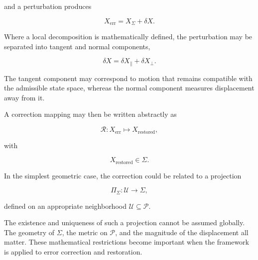 \documentclass[12pt,oneside]{book}
\newcommand{\Corr}{\mathcal{R}}
\begin{document}
and a perturbation produces

\begin{equation}
    X_{\mathrm{err}}
    =
    X_{\Sigma}
    +
    \delta X.
    \label{eq:error-state}
\end{equation}

Where a local decomposition is mathematically defined, the
perturbation may be separated into tangent and normal
components,

\begin{equation}
    \delta X
    =
    \delta X_{\parallel}
    +
    \delta X_{\perp}.
    \label{eq:tangent-normal-decomposition}
\end{equation}

The tangent component may correspond to motion that remains
compatible with the admissible state space, whereas the normal
component measures displacement away from it.

A correction mapping may then be written abstractly as

\begin{equation}
    \Corr:
    X_{\mathrm{err}}
    \longmapsto
    X_{\mathrm{restored}},
    \label{eq:correction-map}
\end{equation}

with

\begin{equation}
    X_{\mathrm{restored}}
    \in
    \Sigma.
    \label{eq:restored-state}
\end{equation}

In the simplest geometric case, the correction could be related
to a projection

\begin{equation}
    \Pi_{\Sigma}:
    \mathcal{U}
    \rightarrow
    \Sigma,
    \label{eq:projection-operator}
\end{equation}

defined on an appropriate neighborhood
\(\mathcal{U}\subseteq\mathcal{P}\).

The existence and uniqueness of such a projection cannot be
assumed globally. The geometry of \(\Sigma\), the metric on
\(\mathcal{P}\), and the magnitude of the displacement all
matter. These mathematical restrictions become important when
the framework is applied to error correction and restoration.

\end{document}
